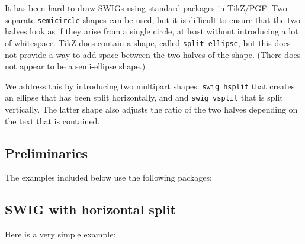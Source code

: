 It has been hard to draw SWIGs using standard packages in TikZ/PGF.  Two separate {\tt semicircle} shapes can be used, but it is difficult to ensure that the two halves look as if they arise from a single circle, at least without introducing a lot of whitespace. TikZ does contain a shape, called {\tt split ellipse}, but this does not provide a way to add space between the two halves of the shape.
(There does not appear to be a semi-ellipse shape.)

We address this by introducing two multipart shapes: {\tt swig hsplit}  that creates an ellipse that has been split horizontally, and
and {\tt swig vsplit} that is split vertically. The latter shape also adjusts the ratio of the two halves depending on the text that is contained.

\eject
\subsection*{Preliminaries}

The examples included below use the following packages:






\subsection*{SWIG with horizontal split}

Here is a very simple example:

\begin{tkzexample}[very small,latex=4cm] 
\end{tkzexample} 

